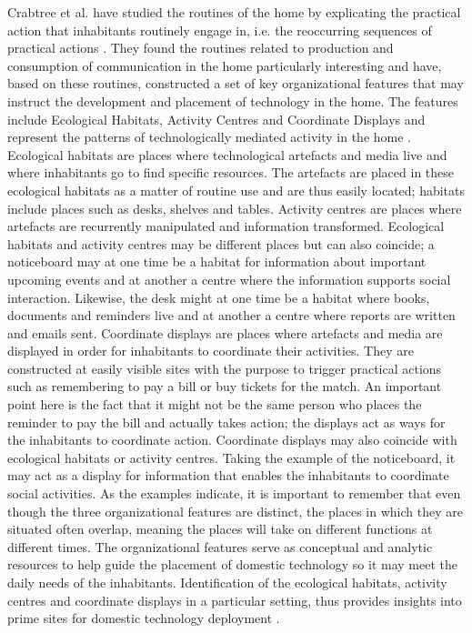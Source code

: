 Crabtree et al. have studied the routines of the home by explicating the practical action that inhabitants routinely engage in, i.e. the reoccurring sequences of practical actions \cite {crabtree2004domestic}. They found the routines related to production and consumption of communication in the home particularly interesting and have, based on these routines, constructed a set of key organizational features that may instruct the development and placement of technology in the home. The features include Ecological Habitats, Activity Centres and Coordinate Displays and represent the patterns of technologically mediated activity in the home \cite{rodden2004between}. Ecological habitats are places where technological artefacts and media live and where inhabitants go to find specific resources. The artefacts are placed in these ecological habitats as a matter of routine use and are thus easily located; habitats include places such as desks, shelves and tables. Activity centres are places where artefacts are recurrently manipulated and information transformed. Ecological habitats and activity centres may be different places but can also coincide; a noticeboard may at one time be a habitat for information about important upcoming events and at another a centre where the information supports social interaction. Likewise, the desk might at one time be a habitat where books, documents and reminders live and at another a centre where reports are written and emails sent. Coordinate displays are places where artefacts and media are displayed in order for inhabitants to coordinate their activities. They are constructed at easily visible sites with the purpose to trigger practical actions such as remembering to pay a bill or buy tickets for the match. An important point here is the fact that it might not be the same person who places the reminder to pay the bill and actually takes action; the displays act as ways for the inhabitants to coordinate action. Coordinate displays may also coincide with ecological habitats or activity centres. Taking the example of the noticeboard, it may act as a display for information that enables the inhabitants to coordinate social activities. As the examples indicate, it is important to remember that even though the three organizational features are distinct, the places in which they are situated often overlap, meaning the places will take on different functions at different times. The organizational features serve as conceptual and analytic resources to help guide the placement of domestic technology so it may meet the daily needs of the inhabitants. Identification of the ecological habitats, activity centres and coordinate displays in a particular setting, thus provides insights into prime sites for domestic technology deployment \cite{crabtree2003finding}.

